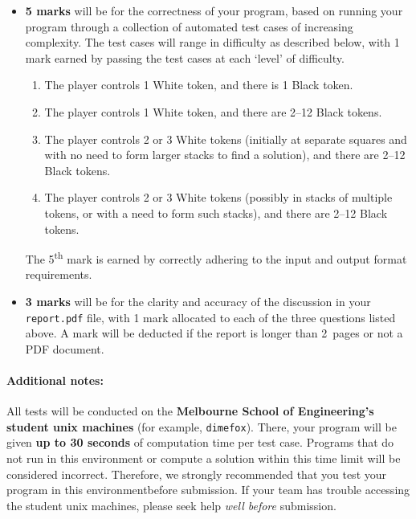 \documentclass[]{article}
\begin{document}
\begin{itemize}
\item
  \textbf{5 marks} will be for the correctness of your program, based on
  running your program through a collection of automated test cases of
  increasing complexity. The test cases will range in difficulty as
  described below, with 1 mark earned by passing the test cases at each
  `level' of difficulty.\footnotemark

  \begin{enumerate}
  \def\labelenumi{\arabic{enumi}.}
  \item
    The player controls 1 White token, and there is 1 Black token.
  \item
    The player controls 1 White token, and there are 2--12 Black tokens.
  \item
    The player controls 2 or 3 White tokens (initially at separate
    squares and with no need to form larger stacks to find a solution),
    and there are 2--12 Black tokens.
  \item
    The player controls 2 or 3 White tokens (possibly in stacks of
    multiple tokens, or with a need to form such stacks),
    and there are 2--12 Black tokens.
  \end{enumerate}

  The 5\textsuperscript{th} mark is earned by correctly adhering to the
  input and output format requirements.
\item
  \textbf{3 marks} will be for the clarity and accuracy of the discussion
  in your \texttt{report.pdf} file, with 1 mark allocated to each of the
  three questions listed above.
  A mark will be deducted if the report is longer than 2~pages or not a
  PDF document.
\end{itemize}


\paragraph{Additional notes:}
All tests will be conducted on the \textbf{Melbourne School of
Engineering's student unix machines} (for example, \texttt{dimefox}).
There, your program will be given \textbf{up to 30 seconds} of
computation time per test case. Programs that do not run in this
environment or compute a solution within this time limit will be
considered incorrect. Therefore, we strongly recommended that you test
your program in this environment\footnotemark before submission.
If your team has trouble accessing the student unix machines, please
seek help \emph{well before} submission.
\end{document}

